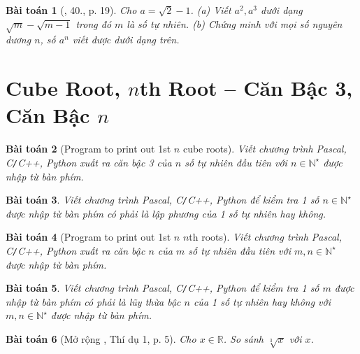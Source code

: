\documentclass{article}
\newtheorem{baitoan}{Bài toán}
\begin{document}
\begin{baitoan}[\cite{Binh_Toan_9_tap_1}, 40., p. 19]
	Cho $a = \sqrt{2} - 1$. (a) Viết $a^2,a^3$ dưới dạng $\sqrt{m} - \sqrt{m - 1}$ trong đó $m$ là số tự nhiên. (b) Chứng minh với mọi số nguyên dương $n$, số $a^n$ viết được dưới dạng trên.
\end{baitoan}


\section{Cube Root, $n$th Root -- Căn Bậc 3, Căn Bậc $n$}

\begin{baitoan}[Program to print out 1st $n$ cube roots]
	Viết chương trình {\sf Pascal, C\texttt{/}C++, Python} xuất ra căn bậc 3 của $n$ số tự nhiên đầu tiên với $n\in\mathbb{N}^\star$ được nhập từ bàn phím.
\end{baitoan}

\begin{baitoan}
	Viết chương trình {\sf Pascal, C\texttt{/}C++, Python} để kiểm tra 1 số $n\in\mathbb{N}^\star$ được nhập từ bàn phím có phải là lập phương của 1 số tự nhiên hay không.
\end{baitoan}

\begin{baitoan}[Program to print out 1st $n$ $n$th roots]
	Viết chương trình {\sf Pascal, C\texttt{/}C++, Python} xuất ra căn bậc $n$ của $m$ số tự nhiên đầu tiên với $m,n\in\mathbb{N}^\star$ được nhập từ bàn phím.
\end{baitoan}

\begin{baitoan}
	Viết chương trình {\sf Pascal, C\texttt{/}C++, Python} để kiểm tra 1 số $m$ được nhập từ bàn phím có phải là lũy thừa bậc $n$ của 1 số tự nhiên hay không với $m,n\in\mathbb{N}^\star$ được nhập từ bàn phím.
\end{baitoan}

\begin{baitoan}[Mở rộng \cite{Tuyen_Toan_9}, Thí dụ 1, p. 5]
	Cho $x\in\mathbb{R}$. So sánh $\sqrt[3]{x}$ với $x$.
\end{baitoan}
\end{document}
